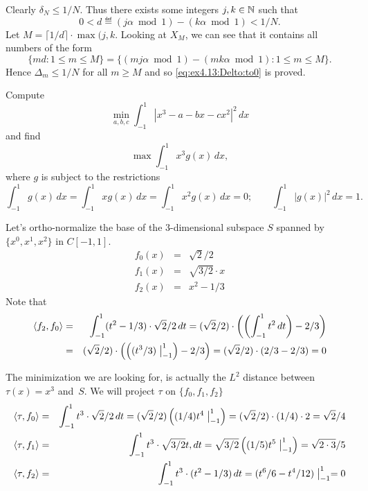 \begin{enumerate}
Clearly
\(\delta_N \leq 1/N\).
Thus there exists some integers \(j,k\in\mathbb{N}\) such that
\begin{equation*}
0 < d \eqdef (j\alpha \bmod 1) - (k\alpha \bmod 1) < 1/N.
\end{equation*}
Let \(M = \lceil 1/d \rceil \cdot \max(j,k\).
Looking at \(X_M\), we can see that it contains
all numbers of the form
\begin{equation*}
\{ md: 1\leq m \leq M\}
=
\{ (mj\alpha \bmod 1) - (mk\alpha \bmod 1): 1\leq m \leq M\}.
\end{equation*}
Hence \(\Delta_m \leq 1/N\) for all \(m\geq M\)
and so \eqref{eq:ex4.13:Delto:to0} is proved.


\begin{excopy}
Compute
\begin{equation*}
 \min_{a,b,c} \int_{-1}^1 |x^3 - a - bx -cx^2|^2 \,dx
\end{equation*}
and find
\begin{equation*}
 \max \int_{-1}^1 x^3 g(x)\,dx,
\end{equation*}
where $g$ is subject to the restrictions
\begin{equation*}
  \int_{-1}^1 g(x)\,dx
  = \int_{-1}^1 x g(x)\,dx
  = \int_{-1}^1 x^2 g(x)\,dx
  = 0 ;
  \qquad
 \int_{-1}^1 |g(x)|^2\,dx=1.
\end{equation*}
\end{excopy}

Let's ortho-normalize the base of the $3$-dimensional subspace $S$
spanned by \(\{x^0, x^1, x^2\}\) in \(C[-1,1]\).
\begin{eqnarray*}
f_0(x) &=& \sqrt{2}/2 \\
f_1(x) &=& \sqrt{3/2}\cdot x \\
f_2(x) &=& x^2 - 1/3
\end{eqnarray*}
Note that
\begin{eqnarray*}
\langle f_2, f_0 \rangle
&=& \int_{-1}^1 (t^2 - 1/3)\cdot \sqrt{2}/2\,dt
   = (\sqrt{2}/2)\cdot \left(\left(\int_{-1}^1 t^2\,dt\right) - 2/3\right) \\
&=& (\sqrt{2}/2)\cdot \left(\left( (t^3/3)\bigm|_{-1}^1 \right) - 2/3\right)
= (\sqrt{2}/2)\cdot ( 2/3 - 2/3)
= 0
\end{eqnarray*}

The minimization we are looking for, is actually the \(L^2\) distance
between \(\tau(x) = x^3\) and~$S$.
We will project \(\tau\) on \(\{f_0,f_1,f_2\}\)
\begin{eqnarray*}
\langle \tau, f_0\rangle
  &=& \int_{-1}^1 t^3\cdot \sqrt{2}/2\,dt
      = (\sqrt{2}/2)\left( (1/4)t^4 \bigm|_{-1}^1 \right)
      = (\sqrt{2}/2)\cdot(1/4)\cdot 2
      = \sqrt{2}/4 \\
\langle \tau, f_1\rangle
 &=& \int_{-1}^1 t^3\cdot \sqrt{3/2}t,dt
      = \sqrt{3/2} \left( (1/5)t^5 \bigm|_{-1}^1 \right)
      =  \sqrt{2\cdot3}/5 \\
\langle \tau, f_2\rangle
 &=&  \int_{-1}^1 t^3\cdot (t^2 - 1/3)\,dt
       =  (t^6/6 - t^4/12)\bigm|_{-1}^1
       =  0
\end{eqnarray*}


\end{enumerate}
